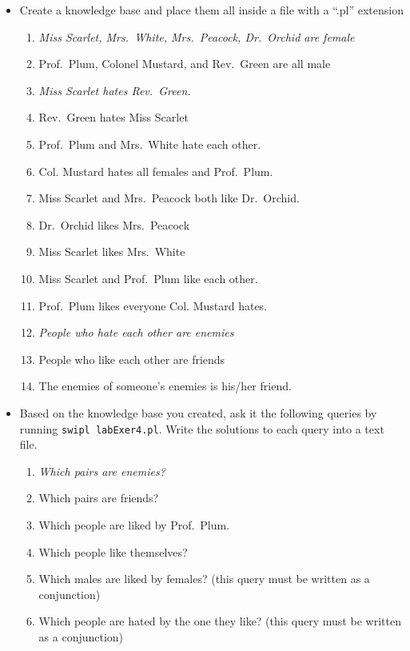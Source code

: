 \begin{itemize}
\tightlist
\item
  Create a knowledge base and place them all inside a file with a
  ``.pl'' extension

  \begin{enumerate}
  \def\labelenumi{\arabic{enumi}.}
  \tightlist
  \item
    \emph{Miss Scarlet, Mrs.~White, Mrs.~Peacock, Dr.~Orchid are female}
  \item
    Prof.~Plum, Colonel Mustard, and Rev.~Green are all male
  \item
    \emph{Miss Scarlet hates Rev.~Green.}
  \item
    Rev.~Green hates Miss Scarlet
  \item
    Prof.~Plum and Mrs.~White hate each other.
  \item
    Col. Mustard hates all females and Prof.~Plum.
  \item
    Miss Scarlet and Mrs.~Peacock both like Dr.~Orchid.
  \item
    Dr.~Orchid likes Mrs.~Peacock
  \item
    Miss Scarlet likes Mrs.~White
  \item
    Miss Scarlet and Prof.~Plum like each other.
  \item
    Prof.~Plum likes everyone Col. Mustard hates.
  \item
    \emph{People who hate each other are enemies}
  \item
    People who like each other are friends
  \item
    The enemies of someone's enemies is his/her friend.
  \end{enumerate}
\item
  Based on the knowledge base you created, ask it the following queries
  by running \texttt{swipl\ labExer4.pl}. Write the solutions to each
  query into a text file.

  \begin{enumerate}
  \def\labelenumi{\arabic{enumi}.}
  \tightlist
  \item
    \emph{Which pairs are enemies?}
  \item
    Which pairs are friends?
  \item
    Which people are liked by Prof.~Plum.
  \item
    Which people like themselves?
  \item
    Which males are liked by females? (this query must be written as a
    conjunction)
  \item
    Which people are hated by the one they like? (this query must be
    written as a conjunction)
  \end{enumerate}
\end{itemize}

